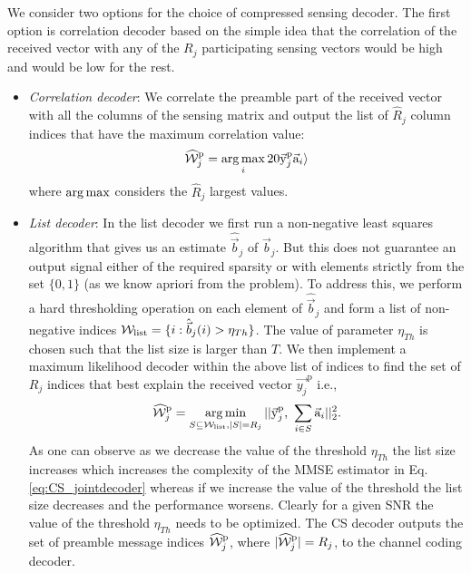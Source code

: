 We consider two options for the choice of compressed sensing decoder. The first option is correlation decoder based on the simple idea that the correlation of the received vector with any of the $R_j$ participating sensing vectors would be high and would be low for the rest.
\begin{itemize}
\item \textit{Correlation decoder}: We correlate the preamble part of the received vector with all the columns of the sensing matrix and output the list of $\hat{R}_j$ column indices that have the maximum correlation value:
\begin{align*}
\widehat{\mathcal{W}}_j^{\mathrm{p}}=\operatorname*{arg\,max}_{i} 20 \vec{\mathrm{y}}_j^{\mathrm{p}}\vec{\mathrm{a}}_i\rangle
\end{align*}
where $\operatorname*{arg\,max}$ considers the $\hat{R}_j$ largest values.
\item \textit{List decoder}: In the list decoder we first run a non-negative least squares %
algorithm that gives us an estimate $\hat{\vec{b}}_j$ of $\vec{b}_j$. But this does not guarantee an output signal either of the required sparsity or with elements strictly from the set $\{0,1\}$ (as we know apriori from the problem). To address this, we perform a hard thresholding operation on each element of $\hat{\vec{b}}_j$ and form a list of non-negative indices $\mathcal{W}_{\text{list}}=\{i:\hat{\vec{b}}_j(i)>\eta_{Th}\}$. The value of parameter $\eta_{Th}$ is chosen such that the list size is larger than $T$. We then implement a maximum likelihood decoder within the above list of indices to find the set of $R_j$ indices that best explain the received vector $\vec{y_j}^{\mathrm{p}}$ i.e.,
\begin{equation}
\widehat{\mathcal{W}}_j^{\mathrm{p}}=\operatorname*{arg\,min}_{S\subseteq\mathcal{W}_{\text{list}},|S|=R_j}||\vec{\mathrm{y}}_j^{\mathrm{p}},~\sum_{i\in S}\vec{\mathrm{a}}_i||^2_2.
\label{eq:CS_jointdecoder}
\end{equation}
As one can observe as we decrease the value of the threshold $\eta_{Th}$ the list size increases which increases the complexity of the MMSE estimator in Eq. \eqref{eq:CS_jointdecoder} whereas if we increase the value of the threshold the list size decreases and the performance worsens. Clearly for a given SNR the value of the threshold $\eta_{Th}$ needs to be optimized. The CS decoder outputs the set of preamble message indices $\widehat{\mathcal{W}}_j^{\mathrm{p}}$, where $|\widehat{\mathcal{W}}_j^{\mathrm{p}}|=R_j$, to the channel coding decoder.
\end{itemize}

